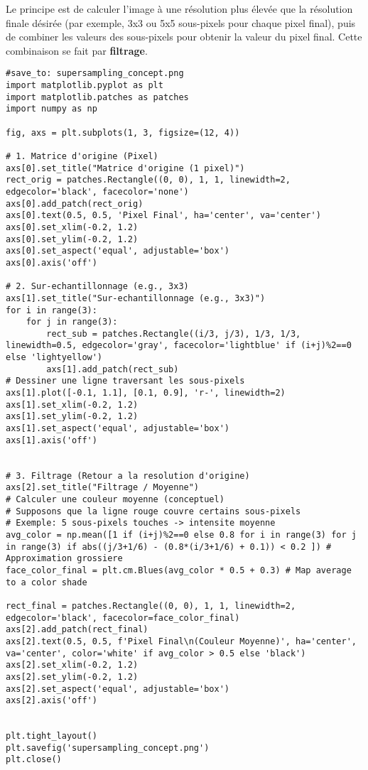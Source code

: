 \documentclass{article}
\begin{document}
Le principe est de calculer l'image à une résolution plus élevée que la résolution finale désirée (par exemple, 3x3 ou 5x5 sous-pixels pour chaque pixel final), puis de combiner les valeurs des sous-pixels pour obtenir la valeur du pixel final. Cette combinaison se fait par \textbf{filtrage}.

\begin{verbatim}
#save_to: supersampling_concept.png
import matplotlib.pyplot as plt
import matplotlib.patches as patches
import numpy as np

fig, axs = plt.subplots(1, 3, figsize=(12, 4))

# 1. Matrice d'origine (Pixel)
axs[0].set_title("Matrice d'origine (1 pixel)")
rect_orig = patches.Rectangle((0, 0), 1, 1, linewidth=2, edgecolor='black', facecolor='none')
axs[0].add_patch(rect_orig)
axs[0].text(0.5, 0.5, 'Pixel Final', ha='center', va='center')
axs[0].set_xlim(-0.2, 1.2)
axs[0].set_ylim(-0.2, 1.2)
axs[0].set_aspect('equal', adjustable='box')
axs[0].axis('off')

# 2. Sur-echantillonnage (e.g., 3x3)
axs[1].set_title("Sur-echantillonnage (e.g., 3x3)")
for i in range(3):
    for j in range(3):
        rect_sub = patches.Rectangle((i/3, j/3), 1/3, 1/3, linewidth=0.5, edgecolor='gray', facecolor='lightblue' if (i+j)%2==0 else 'lightyellow')
        axs[1].add_patch(rect_sub)
# Dessiner une ligne traversant les sous-pixels
axs[1].plot([-0.1, 1.1], [0.1, 0.9], 'r-', linewidth=2)
axs[1].set_xlim(-0.2, 1.2)
axs[1].set_ylim(-0.2, 1.2)
axs[1].set_aspect('equal', adjustable='box')
axs[1].axis('off')


# 3. Filtrage (Retour a la resolution d'origine)
axs[2].set_title("Filtrage / Moyenne")
# Calculer une couleur moyenne (conceptuel)
# Supposons que la ligne rouge couvre certains sous-pixels
# Exemple: 5 sous-pixels touches -> intensite moyenne
avg_color = np.mean([1 if (i+j)%2==0 else 0.8 for i in range(3) for j in range(3) if abs((j/3+1/6) - (0.8*(i/3+1/6) + 0.1)) < 0.2 ]) # Approximation grossiere
face_color_final = plt.cm.Blues(avg_color * 0.5 + 0.3) # Map average to a color shade

rect_final = patches.Rectangle((0, 0), 1, 1, linewidth=2, edgecolor='black', facecolor=face_color_final)
axs[2].add_patch(rect_final)
axs[2].text(0.5, 0.5, f'Pixel Final\n(Couleur Moyenne)', ha='center', va='center', color='white' if avg_color > 0.5 else 'black')
axs[2].set_xlim(-0.2, 1.2)
axs[2].set_ylim(-0.2, 1.2)
axs[2].set_aspect('equal', adjustable='box')
axs[2].axis('off')


plt.tight_layout()
plt.savefig('supersampling_concept.png')
plt.close()
\end{verbatim}
\end{document}
